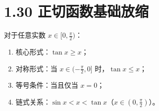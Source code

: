\documentclass{article}
\begin{document}
\section*{1.30 正切函数基础放缩}
对于任意实数 \( x \in [0,\frac{\pi}{2}) \)：
\begin{enumerate}
    \item 核心形式：\( \tan x \geq x \)；
    \item 对称形式：当 \( x \in (-\frac{\pi}{2},0] \) 时，\( \tan x \leq x \)；
    \item 等号条件：当且仅当 \( x=0 \)；
    \item 链式关系：\( \sin x < x < \tan x \)（\( x\in(0,\frac{\pi}{2}) \)）。
\end{enumerate}
\end{document}
